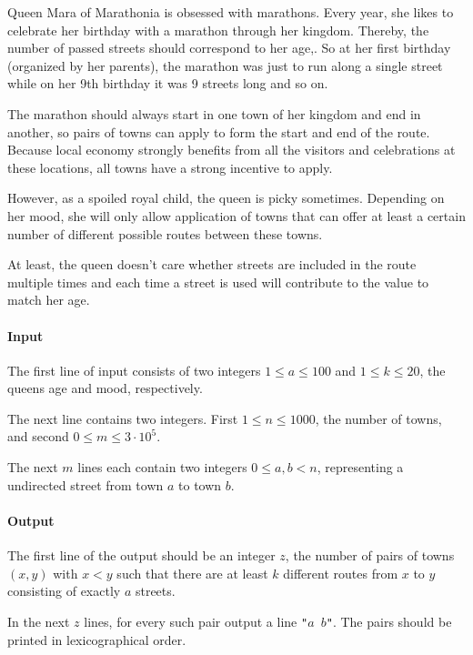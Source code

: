 




Queen Mara of Marathonia is obsessed with marathons. Every year, she likes to celebrate her birthday with a marathon through her kingdom. Thereby, the number of passed streets should correspond to her age,. So at her first birthday (organized by her parents), the marathon was just to run along a single street while on her 9th birthday it was 9 streets long and so on.

The marathon should always start in one town of her kingdom and end in another, so pairs of towns can apply to form the start and end of the route. Because local economy strongly benefits from all the visitors and celebrations at these locations, all towns have a strong incentive to apply.

However, as a spoiled royal child, the queen is picky sometimes. Depending on her mood, she will only allow application of towns that can offer at least a certain number of different possible routes between these towns.

At least, the queen doesn't care whether streets are included in the route multiple times and each time a street is used will contribute to the value to match her age.

\paragraph*{Input}
The first line of input consists of two integers \(1\le a \le 100\) and \(1\le k \le 20\), the queens age and mood, respectively.

The next line contains two integers. First \(1 \le n \le 1000\), the number of towns, and second \(0\le m \le 3\cdot 10^5\). 

The next \(m\) lines each contain two integers \(0 \le a,b < n\), representing a undirected street from town \(a\) to town \(b\). 

\paragraph*{Output}
The first line of the output should be an integer \(z\), the number of pairs of towns \((x,y)\) with \(x < y\) such that there are at least \(k\) different routes from \(x\) to \(y\) consisting of exactly \(a\) streets.

In the next \(z\) lines, for every such pair output a line \texttt{"\(a\) \(b\)"}. The pairs should be printed in lexicographical order.


